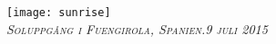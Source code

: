 \noindent\texttt{[image: sunrise]}\\
\textit{\textsc{Soluppgång i Fuengirola, Spanien.}}\hfill\textit{\textsc{9 juli 2015}}
